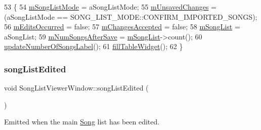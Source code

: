 \begin{DoxyCode}
53 \{
54     \mbox{\hyperlink{class_song_list_viewer_window_a1c242af144718150837feff19386dc73}{mSongListMode}} = aSongListMode;
55     \mbox{\hyperlink{class_song_list_viewer_window_a150efbd08beb368c4acc65621d03d35d}{mUnsavedChanges}} = (aSongListMode == SONG\_LIST\_MODE::CONFIRM\_IMPORTED\_SONGS);
56     \mbox{\hyperlink{class_song_list_viewer_window_a939acaa75e8260232852266a5891fb5f}{mEditsOccurred}} = \textcolor{keyword}{false};
57     \mbox{\hyperlink{class_song_list_viewer_window_aa8fcb59a0ed81ec14c6ac611e1812c08}{mChangesAccepted}} = \textcolor{keyword}{false};
58     \mbox{\hyperlink{class_song_list_viewer_window_a02558cb095f356a1288e5663bc2e1955}{mSongList}} = aSongList;
59     \mbox{\hyperlink{class_song_list_viewer_window_a92cc7fd927ce7dc144f0febb0fdfa434}{mNumSongsAfterSave}} = \mbox{\hyperlink{class_song_list_viewer_window_a02558cb095f356a1288e5663bc2e1955}{mSongList}}->count();
60     \mbox{\hyperlink{class_song_list_viewer_window_a6e956b2dc5372636eeeefbcb9e52c351}{updateNumberOfSongsLabel}}();
61     \mbox{\hyperlink{class_song_list_viewer_window_a5c13d4e89240659b95eb4b70ddc7f37d}{fillTableWidget}}();
62 \}
\end{DoxyCode}
\mbox{\label{class_song_list_viewer_window_a6fb4b39cdd5f7b9a3f8b12bcb2ec4c35}} 
\subsubsection{\texorpdfstring{song\+List\+Edited}{songListEdited}}
{\footnotesize\ttfamily void Song\+List\+Viewer\+Window\+::song\+List\+Edited (\begin{DoxyParamCaption}{ }\end{DoxyParamCaption})\hspace{0.3cm}{\ttfamily [signal]}}



Emitted when the main \mbox{\hyperlink{class_song}{Song}} list has been edited. 

\mbox{\label{class_song_list_viewer_window_a6e956b2dc5372636eeeefbcb9e52c351}} 
